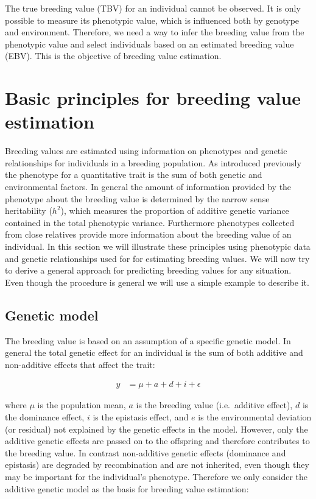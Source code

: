 \documentclass[
]{article}
\begin{document}
The true breeding value (TBV) for an individual cannot be observed. It is only possible to measure its phenotypic value, which is influenced both by genotype and environment. Therefore, we need a way to infer the breeding value from the phenotypic value and select individuals based on an estimated breeding value (EBV). This is the objective of breeding value estimation.

\section{Basic principles for breeding value estimation}\label{basic-principles-for-breeding-value-estimation}

Breeding values are estimated using information on phenotypes and genetic relationships for individuals in a breeding population. As introduced previously the phenotype for a quantitative trait is the sum of both genetic and environmental factors. In general the amount of information provided by the phenotype about the breeding value is determined by the narrow sense heritability (\(h^2\)), which measures the proportion of additive genetic variance contained in the total phenotypic variance. Furthermore phenotypes collected from close relatives provide more information about the breeding value of an individual. In this section we will illustrate these principles using phenotypic data and genetic relationships used for for estimating breeding values. We will now try to derive a general approach for predicting breeding values for any situation. Even though the procedure is general we will use a simple example to describe it.

\subsection{Genetic model}\label{genetic-model}

The breeding value is based on an assumption of a specific genetic model. In general the total genetic effect for an individual is the sum of both additive and non-additive effects that affect the trait:

\begin{align}
    y &=\mu+a+d+i+\epsilon
\end{align}

where \(\mu\) is the population mean, \(a\) is the breeding value (i.e.~additive effect), \(d\) is the dominance effect, \(i\) is the epistasis effect, and \(e\) is the environmental deviation (or residual) not explained by the genetic effects in the model. However, only the additive genetic effects are passed on to the offspring and therefore contributes to the breeding value. In contrast non-additive genetic effects (dominance and epistasis) are degraded by recombination and are not inherited, even though they may be important for the individual's phenotype. Therefore we only consider the additive genetic model as the basis for breeding value estimation:
\end{document}
